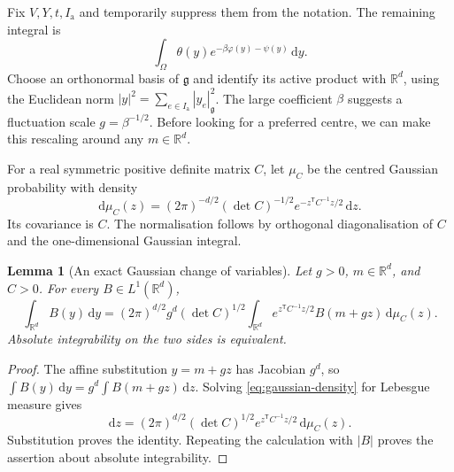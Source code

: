 \documentclass[11pt,reqno]{amsart}
\numberwithin{equation}{section}
\newtheorem{lemma}[theorem]{Lemma}
\theoremstyle{definition}
\theoremstyle{remark}
\newcommand{\R}{\mathbb R}
\newcommand{\dd}{\mathrm d}
\newcommand{\g}{\mathfrak g}
\newcommand{\Ia}{I_{\mathrm a}}
\begin{document}
Fix \(V,Y,t,\Ia\) and temporarily suppress them from the notation.
The remaining integral is
\begin{equation}
                    \int_\Omega\theta(y)e^{-\beta\varphi(y)-\psi(y)}
                    \,\dd y.
 \label{eq:active-integral}
\end{equation}
Choose an orthonormal basis of \(\g\) and identify its active product
with \(\R^d\), using the Euclidean norm
\( |y|^2=\sum_{e\in\Ia}|y_e|_{\g}^2\).
The large coefficient \(\beta\) suggests a fluctuation scale
\(g=\beta^{-1/2}\). Before looking for a preferred centre, we can
make this rescaling around any \(m\in\R^d\).

For a real symmetric positive definite matrix \(C\), let
\(\mu_C\) be the centred Gaussian probability with density
\begin{equation}
 \dd\mu_C(z)=(2\pi)^{-d/2}(\det C)^{-1/2}
                e^{-z^{\mathsf T}C^{-1}z/2}\,\dd z.
 \label{eq:gaussian-density}
\end{equation}
Its covariance is \(C\). The normalisation follows by orthogonal
diagonalisation of \(C\) and the one-dimensional Gaussian integral.

\begin{lemma}[An exact Gaussian change of variables]
\label{lem:gaussian-change}
Let \(g>0\), \(m\in\R^d\), and \(C>0\). For every
\(B\in L^1(\R^d)\),
\begin{equation}
 \int_{\R^d}B(y)\,\dd y
  =(2\pi)^{d/2}g^d(\det C)^{1/2}
       \int_{\R^d}e^{z^{\mathsf T}C^{-1}z/2}B(m+gz)
                                                     \,\dd\mu_C(z).
 \label{eq:gaussian-change}
\end{equation}
Absolute integrability on the two sides is equivalent.
\end{lemma}
\begin{proof}
The affine substitution \(y=m+gz\) has Jacobian \(g^d\), so
\(\int B(y)\,\dd y=g^d\int B(m+gz)\,\dd z\).
Solving \eqref{eq:gaussian-density} for Lebesgue measure gives
\[
 \dd z=(2\pi)^{d/2}(\det C)^{1/2}
                   e^{z^{\mathsf T}C^{-1}z/2}\,\dd\mu_C(z).
\]
Substitution proves the identity. Repeating the calculation with
\(|B|\) proves the assertion about absolute integrability.
\end{proof}
\end{document}
